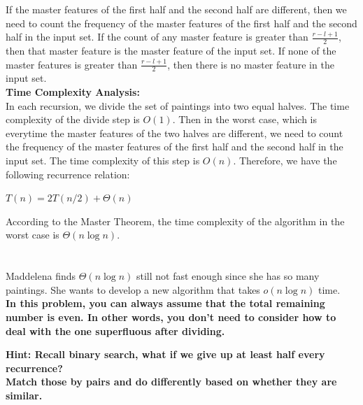 \begin{parts}
\begin{subparts}
\begin{solution}
        If the master features of the first half and the second half are different, then we need to count the frequency of the master features of the first half and the second half in the input set. If the count of any master feature is greater than $ \frac{r-l+1}{2}$, then that master feature is the master feature of the input set. If none of the master features is greater than $ \frac{r-l+1}{2}$, then there is no master feature in the input set. \\
        \textbf{Time Complexity Analysis:} \\
        In each recursion, we divide the set of paintings into two equal halves. The time complexity of the divide step is $O(1)$. Then in the worst case, which is everytime the master features of the two halves are different, we need to count the frequency of the master features of the first half and the second half in the input set. The time complexity of this step is $O(n)$. Therefore, we have the following recurrence relation: \\
        \begin{center}
            $T(n) = 2T(n/2) + \Theta(n)$
        \end{center}
        According to the Master Theorem, the time complexity of the algorithm in the worst case is $\Theta(n\log n)$.
    \end{solution}
\end{subparts}

\part{} 
Maddelena finds $\Theta(n\log n)$ still not fast enough since she has so many paintings. She wants to develop a new algorithm that takes $o(n\log n)$ time.  \\
\textbf{In this problem, you can always assume that the total remaining number is even. In other words, you don't need to consider how to deal with the one superfluous after dividing.}

\textbf{Hint: Recall binary search, what if we give up at least half every recurrence? \\ Match those by pairs and do differently based on whether they are similar.}


\end{parts}
